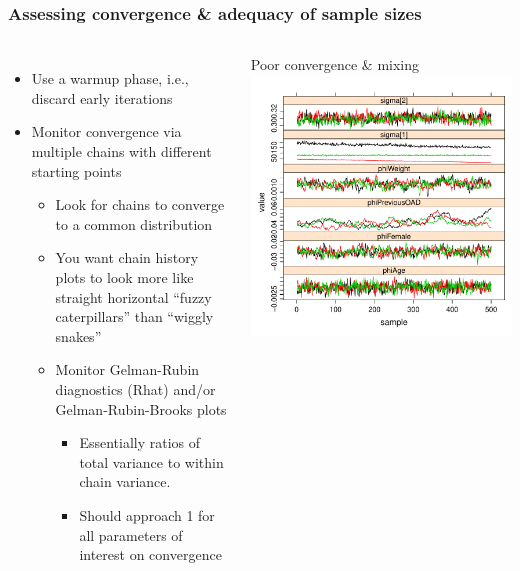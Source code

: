 \documentclass[handout]{beamer}
\begin{document}
\begin{frame}
  \frametitle{Assessing convergence \& adequacy of sample sizes}
  
\begin{columns}
\begin{itemize}
\item Use a warmup phase, i.e., discard early iterations
\item Monitor convergence via multiple chains with different starting points
\begin{itemize}
\item Look for chains to converge to a common distribution
\item You want chain history plots to look more like straight horizontal “fuzzy caterpillars” than “wiggly snakes”
\item Monitor Gelman-Rubin diagnostics (Rhat) and/or Gelman-Rubin-Brooks plots
\begin{itemize}
\item Essentially ratios of total variance to within chain variance.
\item Should approach 1 for all parameters of interest on convergence
\end{itemize}
\end{itemize}
\end{itemize}
\center
\vspace{-16pt}
Poor convergence \& mixing\\
\includegraphics[width=\textwidth,height=0.4\textheight]{graphics/poorConvergence.pdf}\\

\end{columns}
\end{frame}
\end{document}

